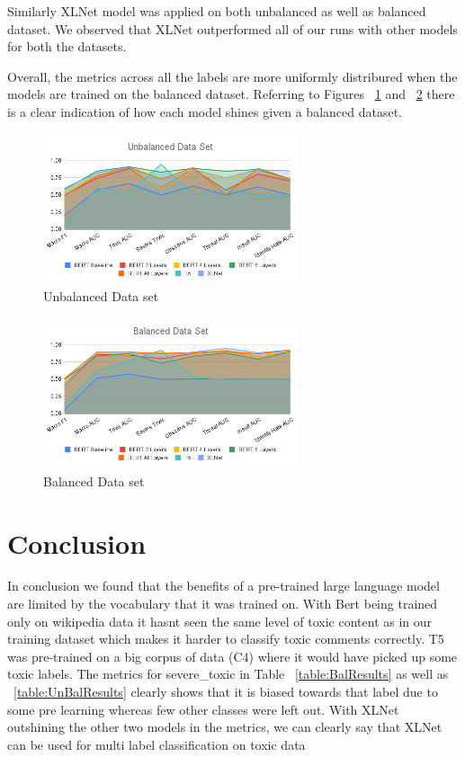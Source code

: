 \documentclass[11pt,a4paper]{article}
\begin{document}
Similarly XLNet model was applied on both unbalanced as well as balanced dataset. We observed that XLNet outperformed all of our runs with other models for both the datasets. 

Overall, the metrics across all the labels are more uniformly distribured when the models are trained on the balanced dataset. Referring to Figures ~\ref{UnbalancedData} and ~\ref{BalancedData} there is a clear indication of how each model shines given a balanced dataset.

\begin{figure}[]
\centering
\includegraphics[width=75mm,scale=0.5]{Unbalanced Data Set.png}
\caption{Unbalanced Data set}
\label{UnbalancedData}
\end{figure}

\begin{figure}[]
\centering
\includegraphics[width=75mm,scale=0.5]{Balanced Data Set.png}
\caption{Balanced Data set}
\label{BalancedData}
\end{figure}
\FloatBarrier

\section{Conclusion}
In conclusion we found that the benefits of a pre-trained large language model are limited by the vocabulary that it was trained on. With Bert being trained only on wikipedia data it hasnt seen the same level of toxic content as in our training dataset which makes it harder to classify toxic comments correctly.
T5 was pre-trained on a big corpus of data (C4) where it would have picked up some toxic labels. The metrics for severe\_toxic in Table ~\ref{table:BalResults} as well as ~\ref{table:UnBalResults} clearly shows that it is biased towards that label due to some pre learning whereas few other classes were left out.
With XLNet outshining the other two models in the metrics, we can clearly say that XLNet can be used for multi label classification on toxic data
\end{document}
